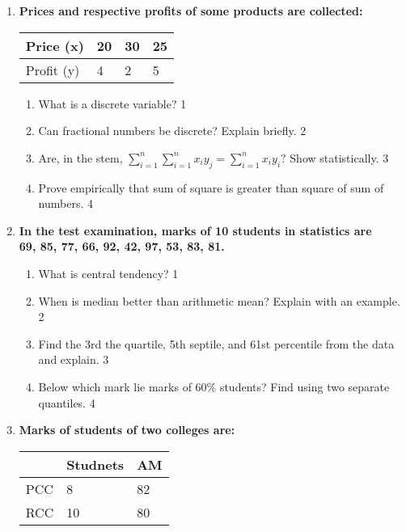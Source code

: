 \documentclass{article}
\begin{document}
\begin{enumerate}
  \item
  \textbf{Prices and respective profits of some products are collected:}
 

\begin{table}[h]
 \begin{center}
\begin{tabular}{l|l|l|l}

Price (x)  & 20 & 30 & 25 \\ \hline
Profit (y) & 4  & 2  & 5  \\ 
\end{tabular}
\end{center}
\end{table}


  \begin{enumerate}
    \item
	What is a discrete variable? \hfill 1
    \item
    	Can fractional numbers be discrete? Explain briefly.  \hfill 2
    \item
    	Are, in the stem, $\displaystyle \sum_{i=1}^{n} \sum_{i=1}^{n} x_iy_j = \sum_{i=1}^{n} x_iy_i?$ Show statistically. \hfill 3
     \item
     	Prove empirically that sum of square is greater than square of sum of numbers. \hfill 4
  \end{enumerate}
  
    \item
  \textbf{In the test examination, marks of 10 students in statistics are \\ 69, 85, 77, 66, 92, 42, 97, 53, 83, 81.}
  \begin{enumerate}
    \item
	What is central tendency? \hfill 1
    \item
	When is median better than arithmetic mean? Explain with an example. \hfill 2
    \item  
	Find the 3rd the quartile, 5th septile, and 61st percentile from the data and explain.  \hfill 3
    \item
	Below which mark lie marks of 60\% students? Find using two separate quantiles. \hfill 4
\end{enumerate}

  \item
  \textbf{Marks of students of two colleges are:}
\begin{table}[h]
 \begin{center}
\begin{tabular}{l|l|l}
    & Studnets & AM \\ \hline
PCC & 8        & 82 \\ \hline
RCC & 10       & 80
\end{tabular}
\end{center}
\end{table}


\end{enumerate}
\end{document}
